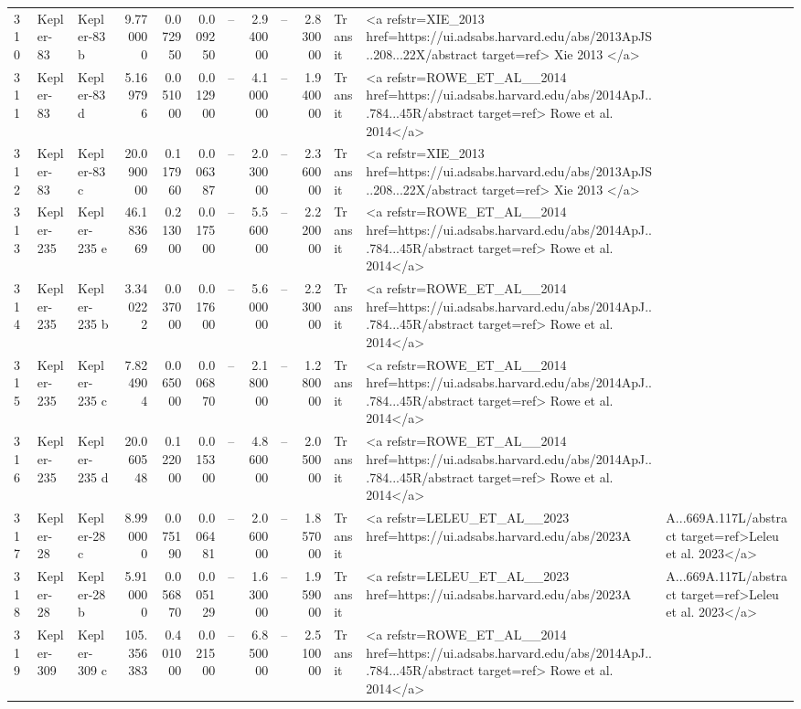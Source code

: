 \begin{tabular}{lllrrrrrrrll}
310 & Kepler-83 & Kepler-83 b & 9.770000 & 0.072950 & 0.009250 & -- & 2.940000 & -- & 2.830000 & Transit & <a refstr=XIE_2013 href=https://ui.adsabs.harvard.edu/abs/2013ApJS..208...22X/abstract target=ref> Xie 2013 </a> \\
311 & Kepler-83 & Kepler-83 d & 5.169796 & 0.051000 & 0.012900 & -- & 4.100000 & -- & 1.940000 & Transit & <a refstr=ROWE_ET_AL__2014 href=https://ui.adsabs.harvard.edu/abs/2014ApJ...784...45R/abstract target=ref> Rowe et al. 2014</a> \\
312 & Kepler-83 & Kepler-83 c & 20.090000 & 0.117960 & 0.006387 & -- & 2.030000 & -- & 2.360000 & Transit & <a refstr=XIE_2013 href=https://ui.adsabs.harvard.edu/abs/2013ApJS..208...22X/abstract target=ref> Xie 2013 </a> \\
313 & Kepler-235 & Kepler-235 e & 46.183669 & 0.213000 & 0.017500 & -- & 5.560000 & -- & 2.220000 & Transit & <a refstr=ROWE_ET_AL__2014 href=https://ui.adsabs.harvard.edu/abs/2014ApJ...784...45R/abstract target=ref> Rowe et al. 2014</a> \\
314 & Kepler-235 & Kepler-235 b & 3.340222 & 0.037000 & 0.017600 & -- & 5.600000 & -- & 2.230000 & Transit & <a refstr=ROWE_ET_AL__2014 href=https://ui.adsabs.harvard.edu/abs/2014ApJ...784...45R/abstract target=ref> Rowe et al. 2014</a> \\
315 & Kepler-235 & Kepler-235 c & 7.824904 & 0.065000 & 0.006870 & -- & 2.180000 & -- & 1.280000 & Transit & <a refstr=ROWE_ET_AL__2014 href=https://ui.adsabs.harvard.edu/abs/2014ApJ...784...45R/abstract target=ref> Rowe et al. 2014</a> \\
316 & Kepler-235 & Kepler-235 d & 20.060548 & 0.122000 & 0.015300 & -- & 4.860000 & -- & 2.050000 & Transit & <a refstr=ROWE_ET_AL__2014 href=https://ui.adsabs.harvard.edu/abs/2014ApJ...784...45R/abstract target=ref> Rowe et al. 2014</a> \\
317 & Kepler-28 & Kepler-28 c & 8.990000 & 0.075190 & 0.006481 & -- & 2.060000 & -- & 1.857000 & Transit & <a refstr=LELEU_ET_AL__2023 href=https://ui.adsabs.harvard.edu/abs/2023A&A...669A.117L/abstract target=ref>Leleu et al. 2023</a> \\
318 & Kepler-28 & Kepler-28 b & 5.910000 & 0.056870 & 0.005129 & -- & 1.630000 & -- & 1.959000 & Transit & <a refstr=LELEU_ET_AL__2023 href=https://ui.adsabs.harvard.edu/abs/2023A&A...669A.117L/abstract target=ref>Leleu et al. 2023</a> \\
319 & Kepler-309 & Kepler-309 c & 105.356383 & 0.401000 & 0.021500 & -- & 6.850000 & -- & 2.510000 & Transit & <a refstr=ROWE_ET_AL__2014 href=https://ui.adsabs.harvard.edu/abs/2014ApJ...784...45R/abstract target=ref> Rowe et al. 2014</a> \\

\end{tabular}
